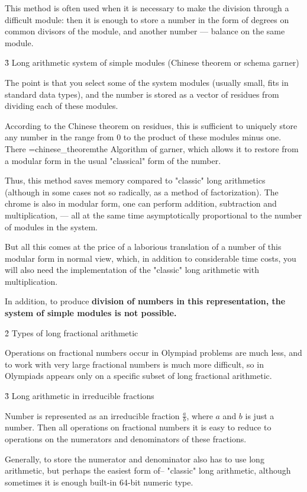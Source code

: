 This method is often used when it is necessary to make the division through a difficult module: then it is enough to store a number in the form of degrees on common divisors of the module, and another number --- balance on the same module.


\h3{ Long arithmetic system of simple modules (Chinese theorem or schema garner) }

The point is that you select some of the system modules (usually small, fits in standard data types), and the number is stored as a vector of residues from dividing each of these modules.

According to the Chinese theorem on residues, this is sufficient to uniquely store any number in the range from 0 to the product of these modules minus one. There \algohref=chinese_theorem{the Algorithm of garner}, which allows it to restore from a modular form in the usual "classical" form of the number.

Thus, this method saves memory compared to "classic" long arithmetics (although in some cases not so radically, as a method of factorization). The chrome is also in modular form, one can perform addition, subtraction and multiplication, --- all at the same time asymptotically proportional to the number of modules in the system.

But all this comes at the price of a laborious translation of a number of this modular form in normal view, which, in addition to considerable time costs, you will also need the implementation of the "classic" long arithmetic with multiplication.

In addition, to produce \bf{division} of numbers in this representation, the system of simple modules is not possible.


\h2{ Types of long fractional arithmetic }

Operations on fractional numbers occur in Olympiad problems are much less, and to work with very large fractional numbers is much more difficult, so in Olympiads appears only on a specific subset of long fractional arithmetic.


\h3{ Long arithmetic in irreducible fractions }

Number is represented as an irreducible fraction $\frac{a}{b}$, where $a$ and $b$ is just a number. Then all operations on fractional numbers it is easy to reduce to operations on the numerators and denominators of these fractions.

Generally, to store the numerator and denominator also has to use long arithmetic, but perhaps the easiest form of-- "classic" long arithmetic, although sometimes it is enough built-in 64-bit numeric type.


